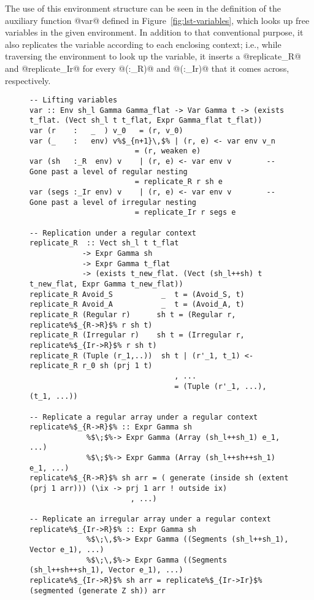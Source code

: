 The use of this environment structure can be seen in the definition of the auxiliary function @var@ defined in Figure~\ref{fig:lst-variables}, which looks up free variables in the given environment. In addition to that conventional purpose, it also replicates the variable according to each enclosing context; i.e., while traversing the environment to look up the variable, it inserts a @replicate_R@ and @replicate_Ir@ for every @(:_R)@ and @(:_Ir)@ that it comes across, respectively.
%
\begin{figure}
\begin{lstlisting}[style=ndp]
-- Lifting variables
var :: Env sh_l Gamma Gamma_flat -> Var Gamma t -> (exists t_flat. (Vect sh_l t t_flat, Expr Gamma_flat t_flat))
var (r    :   _  ) v_0   = (r, v_0)
var (_    :   env) v%$_{n+1}\,$% | (r, e) <- var env v_n
                        = (r, weaken e)
var (sh   :_R  env) v    | (r, e) <- var env v        -- Gone past a level of regular nesting
                        = replicate_R r sh e
var (segs :_Ir env) v    | (r, e) <- var env v        -- Gone past a level of irregular nesting
                        = replicate_Ir r segs e

-- Replication under a regular context
replicate_R  :: Vect sh_l t t_flat
            -> Expr Gamma sh
            -> Expr Gamma t_flat
            -> (exists t_new_flat. (Vect (sh_l++sh) t t_new_flat, Expr Gamma t_new_flat))
replicate_R Avoid_S           _  t = (Avoid_S, t)
replicate_R Avoid_A           _  t = (Avoid_A, t)
replicate_R (Regular r)      sh t = (Regular r, replicate%$_{R->R}$% r sh t)
replicate_R (Irregular r)    sh t = (Irregular r, replicate%$_{Ir->R}$% r sh t)
replicate_R (Tuple (r_1,..))  sh t | (r'_1, t_1) <- replicate_R r_0 sh (prj 1 t)
                                 , ...
                                 = (Tuple (r'_1, ...), (t_1, ...))

-- Replicate a regular array under a regular context
replicate%$_{R->R}$% :: Expr Gamma sh
             %$\;$%-> Expr Gamma (Array (sh_l++sh_1) e_1, ...)
             %$\;$%-> Expr Gamma (Array (sh_l++sh++sh_1) e_1, ...)
replicate%$_{R->R}$% sh arr = ( generate (inside sh (extent (prj 1 arr))) (\ix -> prj 1 arr ! outside ix)
                       , ...)

-- Replicate an irregular array under a regular context
replicate%$_{Ir->R}$% :: Expr Gamma sh
             %$\;\,$%-> Expr Gamma ((Segments (sh_l++sh_1), Vector e_1), ...)
             %$\;\,$%-> Expr Gamma ((Segments (sh_l++sh++sh_1), Vector e_1), ...)
replicate%$_{Ir->R}$% sh arr = replicate%$_{Ir->Ir}$% (segmented (generate Z sh)) arr


\end{lstlisting}
\end{figure}
